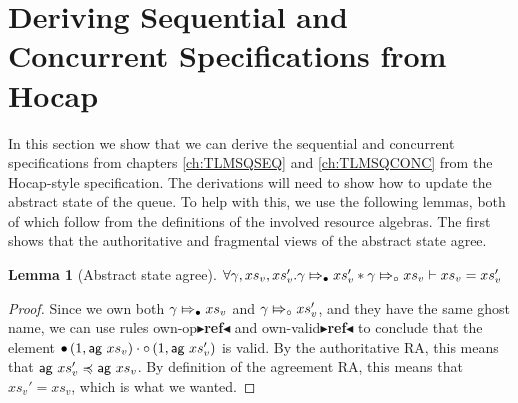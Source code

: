 \documentclass[a4paper, 10pt]{report}
\theoremstyle{definition}
\newtheorem{lemma}[theorem]{Lemma}
\newcommand{\absvalueList}{xs_v}
\newcommand{\abstractstatefullfrag}[2]{#1 \Mapsto_{\circ} #2}
\newcommand{\abstractstateauth}[2]{#1 \Mapsto_{\bullet} #2}
\newcommand{\todo}[1]{{\color[rgb]{.5,0,0}\textbf{$\blacktriangleright$#1$\blacktriangleleft$}}}
\begin{document}
\section{Deriving Sequential and Concurrent Specifications from Hocap}
\label{TLMSQHOCAP:section:deriving-seq-and-conc}

In this section we show that we can derive the sequential and concurrent specifications from chapters \ref{ch:TLMSQSEQ} and \ref{ch:TLMSQCONC} from the Hocap-style specification. The derivations will need to show how to update the abstract state of the queue. To help with this, we use the following lemmas, both of which follow from the definitions of the involved resource algebras. The first shows that the authoritative and fragmental views of the abstract state agree.
\begin{lemma}[Abstract state agree]\label{TLMSQ:hocap:abst:agree}
  $\All \gname, \absvalueList, \absvalueList' .\\
  \abstractstateauth{\gname}{\absvalueList'} \star \abstractstatefullfrag{\gname}{\absvalueList} \proves \absvalueList = \absvalueList'$
\end{lemma}
\begin{proof}
  Since we own both $\abstractstateauth{\gname}{\absvalueList}$ and $\abstractstatefullfrag{\gname}{\absvalueList'}$, and they have the same ghost name, we can use rules own-op\todo{ref} and own-valid\todo{ref} to conclude that the element $\authfull (1, \aginj ~ \absvalueList) \mtimes \authfrag (1, \aginj ~ \absvalueList')$ is valid. By the authoritative RA, this means that $\aginj ~ \absvalueList' \mincl \aginj ~ \absvalueList$. By definition of the agreement RA, this means that $\absvalueList' = \absvalueList$, which is what we wanted.
\end{proof}
\end{document}
